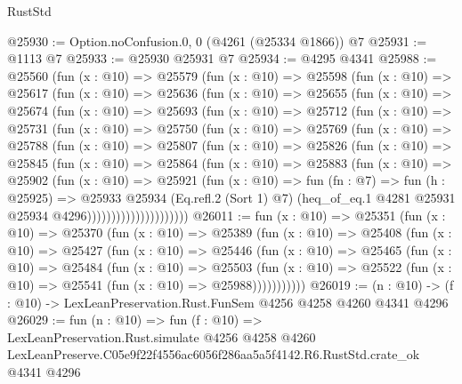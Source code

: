 \begin{lexlean}{RustStd}
\begin{coremodule}
@25930 := Option.noConfusion.{0, 0} (@4261 (@25334 @1866)) @7
@25931 := @1113 @7
@25933 := @25930 @25931 @7
@25934 := @4295 @4341
@25988 := @25560
    (fun (x : @10) =>
    @25579
      (fun (x : @10) =>
      @25598
        (fun (x : @10) =>
        @25617
          (fun (x : @10) =>
          @25636
            (fun (x : @10) =>
            @25655
              (fun (x : @10) =>
              @25674
                (fun (x : @10) =>
                @25693
                  (fun (x : @10) =>
                  @25712
                    (fun (x : @10) =>
                    @25731
                      (fun (x : @10) =>
                      @25750
                        (fun (x : @10) =>
                        @25769
                          (fun (x : @10) =>
                          @25788
                            (fun (x : @10) =>
                            @25807
                              (fun (x : @10) =>
                              @25826
                                (fun (x : @10) =>
                                @25845
                                  (fun (x : @10) =>
                                  @25864
                                    (fun (x : @10) =>
                                    @25883
                                      (fun (x : @10) =>
                                      @25902
                                        (fun (x : @10) =>
                                        @25921
                                          (fun (x : @10) =>
                                          fun (fn : @7) =>
                                          fun (h : @25925) =>
                                          @25933
                                            @25934
                                            (Eq.refl.{2} (Sort 1) @7)
                                            (heq_of_eq.{1}
                                              @4281
                                              @25931
                                              @25934
                                              @4296)))))))))))))))))))))
@26011 := fun (x : @10) =>
  @25351
    (fun (x : @10) =>
    @25370
      (fun (x : @10) =>
      @25389
        (fun (x : @10) =>
        @25408
          (fun (x : @10) =>
          @25427
            (fun (x : @10) =>
            @25446
              (fun (x : @10) =>
              @25465
                (fun (x : @10) =>
                @25484
                  (fun (x : @10) =>
                  @25503
                    (fun (x : @10) =>
                    @25522 (fun (x : @10) => @25541 (fun (x : @10) => @25988)))))))))))
@26019 := (n : @10) -> (f : @10) -> LexLeanPreservation.Rust.FunSem @4256 @4258 @4260 @4341 @4296
@26029 := fun (n : @10) =>
  fun (f : @10) =>
  LexLeanPreservation.Rust.simulate
    @4256
    @4258
    @4260
    LexLeanPreserve.C05e9f22f4556ac6056f286aa5a5f4142.R6.RustStd.crate_ok
    @4341
    @4296
\end{coremodule}
\end{lexlean}
